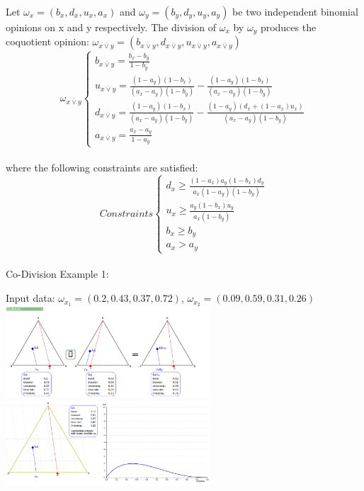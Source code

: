 \documentclass[UTF8]{article}
\newcommand{\opinion}[5]{$\omega_{#1} = (#2, #3, #4, #5)$}
\begin{document}
Let \opinion{x}{b_x}{d_x}{u_x}{a_x} and \opinion{y}{b_y}{d_y}{u_y}{a_y} be two independent binomial opinions on x and y respectively.
The division of $\omega_x$ by $\omega_y$ produces the coquotient opinion: \opinion{x \overline{\lor} y}{b_{x \overline{\lor} y}}{d_{x \overline{\lor} y}}{u_{x \overline{\lor} y}}{a_{x \overline{\lor} y}}
$$
\omega_{x \overline{\lor} y}
\begin{cases}
    b_{x \overline{\lor} y} = \frac{b_x - b_y}{1 - b_y}\\
    u_{x \overline{\lor} y} = \frac{(1 - a_y)(1 - b_x)}{(a_x - a_y)(1 - b_y)} - \frac{(1 - a_y) (1 - b_x)}{(a_x - a_y)(1 - b_y)}\\
    d_{x \overline{\lor} y} = \frac{(1 - a_y) (1 - b_x)}{(a_x - a_y)(1 - b_y)} - \frac{(1 - a_y)(d_x + (1 - a_x)u_x)}{(a_x - a_y)(1 - b_y)}\\
    a_{x \overline{\lor} y} = \frac{a_x - a_y}{1 - a_y}
\end{cases}
$$\\
where the following constraints are satisfied:
$$
Constraints
\begin{cases}
    d_x \geq \frac{(1 - a_x)a_y(1 - b_x)d_y}{a_x(1 - a_y)(1 - b_y)}\\
    u_x \geq \frac{a_y(1 - b_x) u_y}{a_x (1 - b_y)}\\
    b_x \geq b_y\\
    a_x > a_y
\end{cases}
$$\\
Co-Division Example 1:\\
\begin{center}
    Input data:
    \opinion{x_1}{0.2}{0.43}{0.37}{0.72}, 
    \opinion{x_2}{0.09}{0.59}{0.31}{0.26}\\
    \includegraphics[width=3in]{images/codiv1.png}
    \includegraphics[width=3in]{images/codiv1viz.png}
\end{center}
\end{document}
